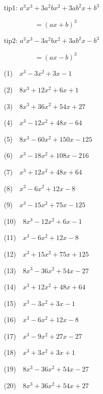 \documentclass[a4j,twocolumn,10pt,fleqn]{jarticle}
\begin{document}
tip1: $a^{3} x^{3} + 3 a^{2} b x^{2} + 3 a b^{2} x + b^{3}$

~~~~~~~~~$=\left(a x + b\right)^{3}$


tip2: $a^{3} x^{3} - 3 a^{2} b x^{2} + 3 a b^{2} x - b^{3}$

~~~~~~~~~$=\left(a x - b\right)^{3}$


(1)~~$x^{3} - 3 x^{2} + 3 x - 1$

(2)~~$8 x^{3} + 12 x^{2} + 6 x + 1$

(3)~~$8 x^{3} + 36 x^{2} + 54 x + 27$

(4)~~$x^{3} - 12 x^{2} + 48 x - 64$

(5)~~$8 x^{3} - 60 x^{2} + 150 x - 125$

(6)~~$x^{3} - 18 x^{2} + 108 x - 216$

(7)~~$x^{3} + 12 x^{2} + 48 x + 64$

(8)~~$x^{3} - 6 x^{2} + 12 x - 8$

(9)~~$x^{3} - 15 x^{2} + 75 x - 125$

(10)~~$8 x^{3} - 12 x^{2} + 6 x - 1$

(11)~~$x^{3} - 6 x^{2} + 12 x - 8$

(12)~~$x^{3} + 15 x^{2} + 75 x + 125$

(13)~~$8 x^{3} - 36 x^{2} + 54 x - 27$

(14)~~$x^{3} + 12 x^{2} + 48 x + 64$

(15)~~$x^{3} - 3 x^{2} + 3 x - 1$

(16)~~$x^{3} - 6 x^{2} + 12 x - 8$

(17)~~$x^{3} - 9 x^{2} + 27 x - 27$

(18)~~$x^{3} + 3 x^{2} + 3 x + 1$

(19)~~$8 x^{3} - 36 x^{2} + 54 x - 27$

(20)~~$8 x^{3} + 36 x^{2} + 54 x + 27$
\end{document}
